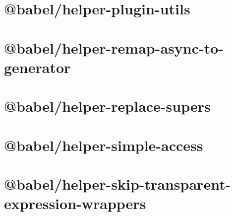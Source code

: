 \documentclass[twoside]{book}
\newcommand{\+}{\discretionary{\mbox{\scriptsize$\hookleftarrow$}}{}{}}
\begin{document}
\chapter{@babel/helper-\/plugin-\/utils}
\label{md__c___users_vaishnavi_jadhav__desktop__developer_code_mean_stack_example_client_node_modules__196942884fd9b08a6399da84059a1bf3}

\chapter{@babel/helper-\/remap-\/async-\/to-\/generator}
\label{md__c___users_vaishnavi_jadhav__desktop__developer_code_mean_stack_example_client_node_modules__a5bcb3138ee44c7572dc76ea8e5eff21}

\chapter{@babel/helper-\/replace-\/supers}
\label{md__c___users_vaishnavi_jadhav__desktop__developer_code_mean_stack_example_client_node_modules__a638adbef1b63fe17cafae77b350d1ee}

\chapter{@babel/helper-\/simple-\/access}
\label{md__c___users_vaishnavi_jadhav__desktop__developer_code_mean_stack_example_client_node_modules__1632113a51d226dadb433f137e93b91c}

\chapter{@babel/helper-\/skip-\/transparent-\/expression-\/wrappers}
\label{md__c___users_vaishnavi_jadhav__desktop__developer_code_mean_stack_example_client_node_modules__2e8011d3efe7cb5cb0c7183e3f023d78}

\end{document}
